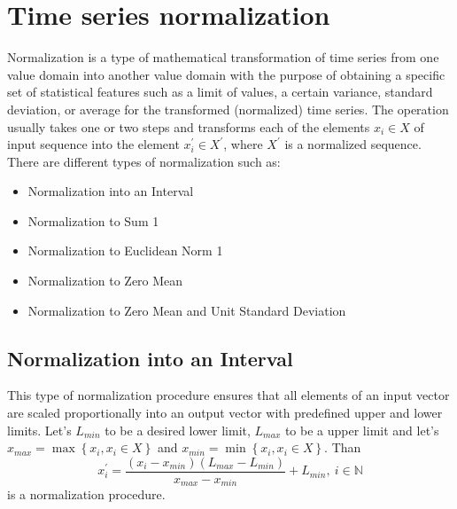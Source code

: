 \section{Time series normalization} \label{normalization}

Normalization is a type of mathematical transformation of time series from one value domain into another value domain with the purpose of obtaining a specific set of statistical features such as a limit of values, a certain variance, standard deviation, or average for the transformed (normalized) time series. The operation usually takes one or two steps and transforms each of the elements $x_{i} \in X$ of input sequence into the element $x_{i}^{'} \in X^{'}$, where $X^{'}$ is a normalized sequence. There are different types of normalization such as:
\begin{itemize}
	\item Normalization into an Interval \cite{citeulike:4295248} \cite{citeulike:2753031}
  \item Normalization to Sum 1
  \item Normalization to Euclidean Norm 1
  \item Normalization to Zero Mean
  \item Normalization to Zero Mean and Unit Standard Deviation \cite{citeulike:3815880}
\end{itemize}

\subsection{Normalization into an Interval}
This type of normalization procedure ensures that all elements of an input vector are scaled proportionally into an output vector with predefined upper and lower limits.
Let's $L_{min}$ to be a desired lower limit, $L_{max}$ to be a upper limit and let's $x_{max} = \max \left\{ x_{i}, x_{i} \in X \right\}$ and $x_{min} = \min \left\{ x_{i}, x_{i} \in X \right\}$. Than
\begin{equation}
x_{i}^{'} = \frac{ (x_{i}-x_{min}) (L_{max} - L_{min}) }{ x_{max} - x_{min} } + L_{min	}, \: i \in \mathbb{N}
\end{equation}
is a normalization procedure.

